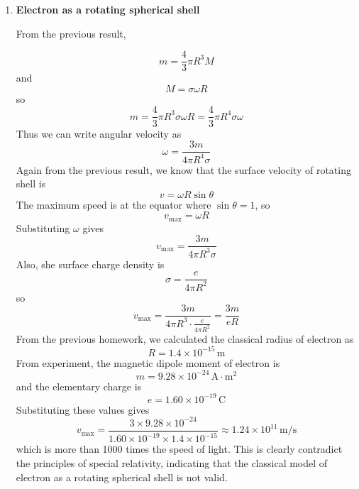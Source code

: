 \documentclass[12pt]{article}
\begin{document}
\begin{enumerate}
\begin{itemize}
\item[(e)] \textbf{Magnetic dipole moment}

For a uniformly magnetized sphere,

\[
\vec m
=
\vec M \times (\text{volume})
\]

that is,

\[
\vec m
=
\vec M
\left(
\frac{4}{3}\pi R^3
\right)
\]

Therefore,

\[
\boxed{
\vec m=
\frac{4}{3}\pi R^3 M\,\hat z
}
\]

\end{itemize}

\vspace{0.5cm}

\item \textbf{Electron as a rotating spherical shell}

From the previous result,

\[
m=\frac{4}{3}\pi R^3 M
\]
and
\[M=\sigma\omega R
\]
so
\[m=\frac{4}{3}\pi R^3 \sigma\omega R
=\frac{4}{3}\pi R^4 \sigma\omega
\]
Thus we can write angular velocity as
\[\omega=\frac{3m}{4\pi R^4 \sigma}
\]
Again from the previous result, we know that the surface velocity of rotating shell is
\[v=\omega R\sin\theta
\]
The maximum speed is at the equator where \(\sin\theta=1\), so
\[v_{\text{max}}=\omega R
\]
Substituting \(\omega\) gives
\[v_{\text{max}}=\frac{3m}{4\pi R^3 \sigma}
\]
Also, she surface charge density is
\[\sigma=\frac{e}{4\pi R^2}
\]
so
\[v_{\text{max}}=\frac{3m}{4\pi R^3 \cdot \frac{e}{4\pi R^2}}
=\frac{3m}{eR}
\]
From the previous homework, we calculated the classical radius of electron as
\[R=1.4 \times 10^{-15}\,\text{m}
\]
From experiment, the magnetic dipole moment of electron is
\[m=9.28 \times 10^{-24}\,\text{A}\cdot\text{m}^2
\]
and the elementary charge is
\[e=1.60 \times 10^{-19}\,\text{C}
\]
Substituting these values gives
\[v_{\text{max}}=\frac{3 \times 9.28 \times 10^{-24}}{1.60 \times 10^{-19} \times 1.4 \times 10^{-15}}
\approx 1.24 \times 10^{11}\,\text{m/s}
\]
which is more than 1000 times the speed of light. This is clearly contradict the principles of special relativity, indicating that the classical model of electron as a rotating spherical shell is not valid.
\end{enumerate}
\end{document}
